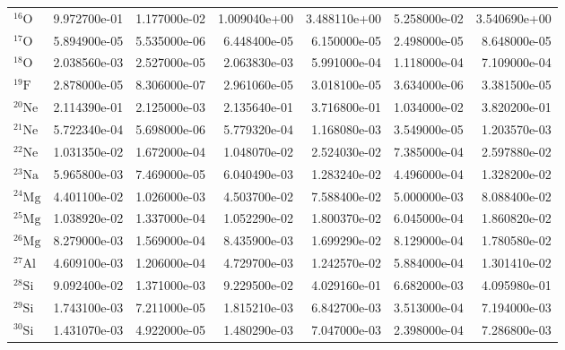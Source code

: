 \begin{tabular}{lrrrrrr}
$^{16}\mathrm{O}$   &       9.972700e-01 &      1.177000e-02 &      1.009040e+00 &       3.488110e+00 &      5.258000e-02 &      3.540690e+00 \\
$^{17}\mathrm{O}$   &       5.894900e-05 &      5.535000e-06 &      6.448400e-05 &       6.150000e-05 &      2.498000e-05 &      8.648000e-05 \\
$^{18}\mathrm{O}$   &       2.038560e-03 &      2.527000e-05 &      2.063830e-03 &       5.991000e-04 &      1.118000e-04 &      7.109000e-04 \\
$^{19}\mathrm{F}$   &       2.878000e-05 &      8.306000e-07 &      2.961060e-05 &       3.018100e-05 &      3.634000e-06 &      3.381500e-05 \\
$^{20}\mathrm{Ne}$  &       2.114390e-01 &      2.125000e-03 &      2.135640e-01 &       3.716800e-01 &      1.034000e-02 &      3.820200e-01 \\
$^{21}\mathrm{Ne}$  &       5.722340e-04 &      5.698000e-06 &      5.779320e-04 &       1.168080e-03 &      3.549000e-05 &      1.203570e-03 \\
$^{22}\mathrm{Ne}$  &       1.031350e-02 &      1.672000e-04 &      1.048070e-02 &       2.524030e-02 &      7.385000e-04 &      2.597880e-02 \\
$^{23}\mathrm{Na}$  &       5.965800e-03 &      7.469000e-05 &      6.040490e-03 &       1.283240e-02 &      4.496000e-04 &      1.328200e-02 \\
$^{24}\mathrm{Mg}$  &       4.401100e-02 &      1.026000e-03 &      4.503700e-02 &       7.588400e-02 &      5.000000e-03 &      8.088400e-02 \\
$^{25}\mathrm{Mg}$  &       1.038920e-02 &      1.337000e-04 &      1.052290e-02 &       1.800370e-02 &      6.045000e-04 &      1.860820e-02 \\
$^{26}\mathrm{Mg}$  &       8.279000e-03 &      1.569000e-04 &      8.435900e-03 &       1.699290e-02 &      8.129000e-04 &      1.780580e-02 \\
$^{27}\mathrm{Al}$  &       4.609100e-03 &      1.206000e-04 &      4.729700e-03 &       1.242570e-02 &      5.884000e-04 &      1.301410e-02 \\
$^{28}\mathrm{Si}$  &       9.092400e-02 &      1.371000e-03 &      9.229500e-02 &       4.029160e-01 &      6.682000e-03 &      4.095980e-01 \\
$^{29}\mathrm{Si}$  &       1.743100e-03 &      7.211000e-05 &      1.815210e-03 &       6.842700e-03 &      3.513000e-04 &      7.194000e-03 \\
$^{30}\mathrm{Si}$  &       1.431070e-03 &      4.922000e-05 &      1.480290e-03 &       7.047000e-03 &      2.398000e-04 &      7.286800e-03 \\

\end{tabular}
